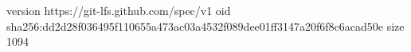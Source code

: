 version https://git-lfs.github.com/spec/v1
oid sha256:dd2d28f036495f110655a473ac03a4532f089dee01ff3147a20f6f8c6acad50e
size 1094

